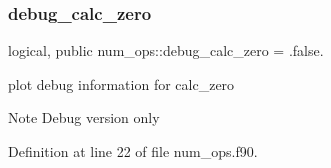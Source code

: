 \subsubsection{\texorpdfstring{debug\+\_\+calc\+\_\+zero}{debug\_calc\_zero}}
{\footnotesize\ttfamily logical, public num\+\_\+ops\+::debug\+\_\+calc\+\_\+zero = .false.}



plot debug information for calc\+\_\+zero 

\begin{DoxyNote}{Note}
Debug version only 
\end{DoxyNote}


Definition at line 22 of file num\+\_\+ops.\+f90.

